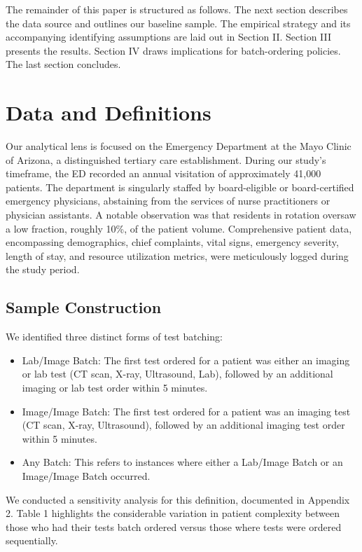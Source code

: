 \documentclass[,,nonblindrev]{informs}
\begin{document}
The remainder of this paper is structured as follows. The next section
describes the data source and outlines our baseline sample. The
empirical strategy and its accompanying identifying assumptions are laid
out in Section II. Section III presents the results. Section IV draws
implications for batch-ordering policies. The last section concludes.

\hypertarget{sec:2}{%
\section{Data and Definitions}\label{sec:2}}

Our analytical lens is focused on the Emergency Department at the Mayo
Clinic of Arizona, a distinguished tertiary care establishment. During
our study's timeframe, the ED recorded an annual visitation of
approximately 41,000 patients. The department is singularly staffed by
board-eligible or board-certified emergency physicians, abstaining from
the services of nurse practitioners or physician assistants. A notable
observation was that residents in rotation oversaw a low fraction,
roughly 10\%, of the patient volume. Comprehensive patient data,
encompassing demographics, chief complaints, vital signs, emergency
severity, length of stay, and resource utilization metrics, were
meticulously logged during the study period.

\hypertarget{sample-construction}{%
\subsection{Sample Construction}\label{sample-construction}}

We identified three distinct forms of test batching:

\begin{itemize}
\item
  Lab/Image Batch: The first test ordered for a patient was either an
  imaging or lab test (CT scan, X-ray, Ultrasound, Lab), followed by an
  additional imaging or lab test order within 5 minutes.
\item
  Image/Image Batch: The first test ordered for a patient was an imaging
  test (CT scan, X-ray, Ultrasound), followed by an additional imaging
  test order within 5 minutes.
\item
  Any Batch: This refers to instances where either a Lab/Image Batch or
  an Image/Image Batch occurred.
\end{itemize}

We conducted a sensitivity analysis for this definition, documented in
Appendix 2. Table 1 highlights the considerable variation in patient
complexity between those who had their tests batch ordered versus those
where tests were ordered sequentially.
\end{document}
